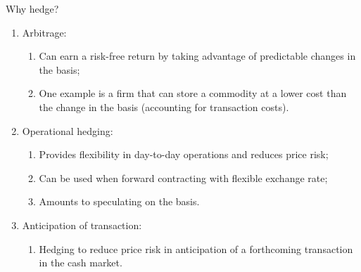 \documentclass[table,xcolor=pdftex,dvipsnames]{beamer}\usepackage[]{graphicx}\usepackage[]{color}
\begin{document}

\begin{frame}{Why hedge?}
\begin{enumerate}[label=\textbullet]
  \item Arbitrage:
    \begin{enumerate}[label=-]
         \item Can earn a risk-free return by taking advantage of predictable changes in the basis;
         \item One example is a firm that can store a commodity at a lower cost than the change in the basis (accounting for transaction costs).
    \end{enumerate}
  \item Operational hedging:
      \begin{enumerate}[label=-]
            \item Provides flexibility in day-to-day operations and reduces price risk;
            \item Can be used when forward contracting with flexible exchange rate;
            \item Amounts to speculating on the basis.
      \end{enumerate}
  \item Anticipation of transaction:
      \begin{enumerate}[label=-]
            \item Hedging to reduce price risk in anticipation of a forthcoming transaction in the cash market.
      \end{enumerate}
\end{enumerate}
\end{frame}

\end{document}
